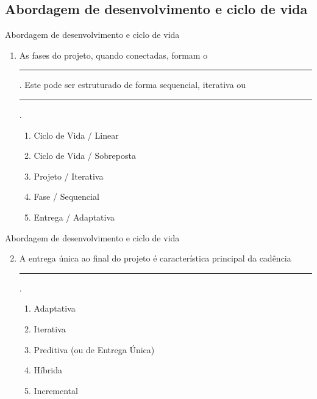 \documentclass{beamer}
\begin{document}
\subsection{Abordagem de desenvolvimento e ciclo de vida}

\begin{frame}{Abordagem de desenvolvimento e ciclo de vida}
	\begin{enumerate}
		\justifying
		\item As fases do projeto, quando conectadas, formam o \rule{60pt}{1pt}. Este pode ser estruturado de forma sequencial, iterativa ou \rule{60pt}{1pt}.
		\begin{enumerate}[a]
			\item Ciclo de Vida / Linear
			\item \alert<2>{Ciclo de Vida / Sobreposta}
			\item Projeto / Iterativa
			\item Fase / Sequencial
			\item Entrega / Adaptativa
		\end{enumerate}
	\end{enumerate}
\end{frame}

\begin{frame}{Abordagem de desenvolvimento e ciclo de vida}
	\begin{enumerate}
		\setcounter{enumi}{1}
		\justifying
		\item A entrega única ao final do projeto é característica principal da cadência \rule{60pt}{1pt}.
		\begin{enumerate}[a]
			\item Adaptativa
			\item Iterativa
			\item \alert<2>{Preditiva (ou de Entrega Única)}
			\item Híbrida
			\item Incremental
		\end{enumerate}
	\end{enumerate}
\end{frame}
\end{document}
